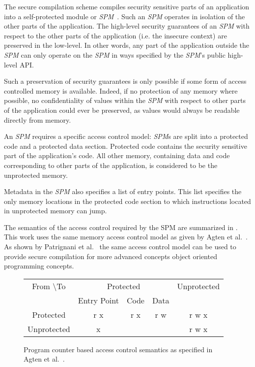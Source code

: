 The secure compilation scheme compiles security sensitive parts of an application into a self-protected module or \emph{SPM}~\cite{PCBAC}.
Such an \emph{SPM} operates in isolation of the other parts of the application.
The high-level security guarantees of an \emph{SPM} with respect to the other parts of the application (i.e. the insecure context) are preserved in the low-level.
In other words, any part of the application outside the \emph{SPM} can only operate on the \emph{SPM} in ways specified by the \emph{SPM}'s public high-level API.

Such a preservation of security guarantees is only possible if some form of access controlled memory is available.
Indeed, if no protection of any memory where possible, no confidentiality of values within the \emph{SPM} with respect to other parts of the application could ever be preserved, as values would always be readable directly from memory.

An \emph{SPM} requires a specific access control model: \emph{SPM}s are split into a protected code and a protected data section.
Protected code contains the security sensitive part of the application's code.
All other memory, containing data and code corresponding to other parts of the application, is considered to be the unprotected memory.

Metadata in the \emph{SPM} also specifies a list of entry points.
This list specifies the only memory locations in the protected code section to which instructions located in unprotected memory can jump.

The semantics of the access control required by the SPM are summarized in .
This work uses the same memory access control model as given by Agten et al.~\cite{Agten:2012:SCM:2354412.2355247}.
As shown by Patrignani et al.~\cite{Patrignani} the same access control model can be used to provide secure compilation for more advanced concepts object oriented programming concepts.

\begin{figure}[htb]
    \centering
	\begin{tabular}{|c|c|c|c|c|}
		\hline
		From \textbackslash To & \multicolumn{3}{c|}{Protected} & Unprotected \\
		& Entry Point & Code & Data & \\ \hline
		Protected & r x & r x & r w & r w x \\ \hline
		Unprotected & x & & & r w x \\ \hline
	\end{tabular}
    \caption[PCBAC Semantics]{Program counter based access control semantics as specified in Agten et al.~\cite{Agten:2012:SCM:2354412.2355247}. \label{fig:AccessControlSemantics}}
\end{figure}

